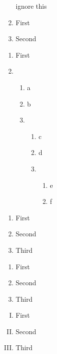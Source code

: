 \documentclass{article}
\begin{document}
\begin{enumerate}
ignore this
\item First
\item Second
\end{enumerate}

\begin{enumerate}
\item First
\item
    \begin{enumerate}
    \item a
    \item b
    \item
        \begin{enumerate}
        \item c
        \item d
        \item
            \begin{enumerate}
            \item e
            \item f
            \end{enumerate}
        \end{enumerate}
    \end{enumerate}
\end{enumerate}

\begin{enumerate}[1)]
\item First
\item Second
\item Third
\end{enumerate}

\begin{enumerate}[a>]
\item First
\item Second
\item Third
\end{enumerate}

\begin{enumerate}[I)]
\item First
\item Second
\item Third
\end{enumerate}
\end{document}
